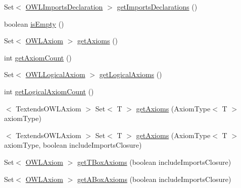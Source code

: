 \begin{DoxyCompactItemize}
\item 
Set$<$ \hyperlink{interfaceorg_1_1semanticweb_1_1owlapi_1_1model_1_1_o_w_l_imports_declaration}{O\-W\-L\-Imports\-Declaration} $>$ \hyperlink{interfaceorg_1_1semanticweb_1_1owlapi_1_1model_1_1_o_w_l_ontology_ad6f6166c7ff17dce6d3e72a3ba29eae4}{get\-Imports\-Declarations} ()
\item 
boolean \hyperlink{interfaceorg_1_1semanticweb_1_1owlapi_1_1model_1_1_o_w_l_ontology_ab318bb166cbf65aca5dccbdbaa7298c6}{is\-Empty} ()
\item 
Set$<$ \hyperlink{interfaceorg_1_1semanticweb_1_1owlapi_1_1model_1_1_o_w_l_axiom}{O\-W\-L\-Axiom} $>$ \hyperlink{interfaceorg_1_1semanticweb_1_1owlapi_1_1model_1_1_o_w_l_ontology_a650a728c2c12af706c91914d82bed2a1}{get\-Axioms} ()
\item 
int \hyperlink{interfaceorg_1_1semanticweb_1_1owlapi_1_1model_1_1_o_w_l_ontology_a2422d78cf5844918de68e15337fdd0db}{get\-Axiom\-Count} ()
\item 
Set$<$ \hyperlink{interfaceorg_1_1semanticweb_1_1owlapi_1_1model_1_1_o_w_l_logical_axiom}{O\-W\-L\-Logical\-Axiom} $>$ \hyperlink{interfaceorg_1_1semanticweb_1_1owlapi_1_1model_1_1_o_w_l_ontology_ac7515cd65f3ee633dfb2982d2620fbc5}{get\-Logical\-Axioms} ()
\item 
int \hyperlink{interfaceorg_1_1semanticweb_1_1owlapi_1_1model_1_1_o_w_l_ontology_a3ac04dc41c28b1e43ed4f02144d255aa}{get\-Logical\-Axiom\-Count} ()
\item 
$<$ Textends\-O\-W\-L\-Axiom $>$ Set$<$ T $>$ \hyperlink{interfaceorg_1_1semanticweb_1_1owlapi_1_1model_1_1_o_w_l_ontology_a22d968bbd3bee4eeb1fac22d390cf3fc}{get\-Axioms} (Axiom\-Type$<$ T $>$ axiom\-Type)
\item 
$<$ Textends\-O\-W\-L\-Axiom $>$ Set$<$ T $>$ \hyperlink{interfaceorg_1_1semanticweb_1_1owlapi_1_1model_1_1_o_w_l_ontology_a031d20270efa113ce967361ab891938a}{get\-Axioms} (Axiom\-Type$<$ T $>$ axiom\-Type, boolean include\-Imports\-Closure)
\item 
Set$<$ \hyperlink{interfaceorg_1_1semanticweb_1_1owlapi_1_1model_1_1_o_w_l_axiom}{O\-W\-L\-Axiom} $>$ \hyperlink{interfaceorg_1_1semanticweb_1_1owlapi_1_1model_1_1_o_w_l_ontology_a5553836d365c92e2181c0063e8e898ce}{get\-T\-Box\-Axioms} (boolean include\-Imports\-Closure)
\item 
Set$<$ \hyperlink{interfaceorg_1_1semanticweb_1_1owlapi_1_1model_1_1_o_w_l_axiom}{O\-W\-L\-Axiom} $>$ \hyperlink{interfaceorg_1_1semanticweb_1_1owlapi_1_1model_1_1_o_w_l_ontology_a790151c05bd48af1a280ca4d1bf13d32}{get\-A\-Box\-Axioms} (boolean include\-Imports\-Closure)

\end{DoxyCompactItemize}

